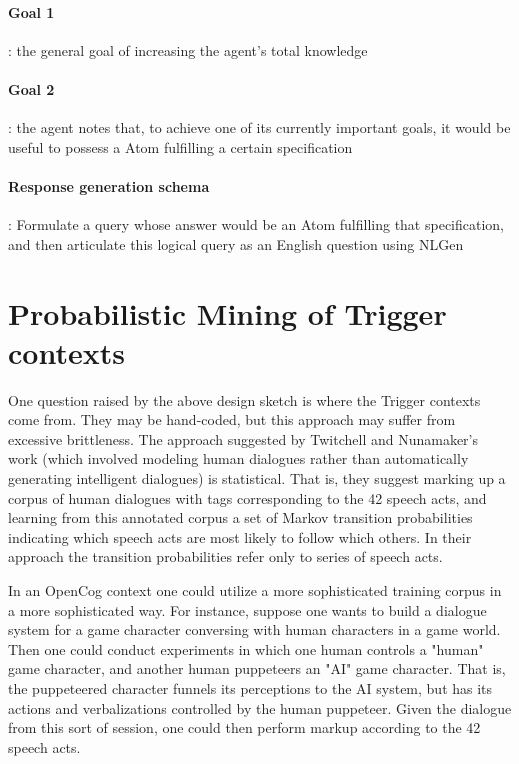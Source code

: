 \documentclass[10pt]{article}
\begin{document}
\paragraph{Goal 1}: the general goal of increasing the agent's total knowledge 

\paragraph{Goal 2}: the agent notes that, to achieve one of its currently important goals, it would be useful to possess a Atom fulfilling a certain specification

\paragraph{Response generation schema}: Formulate a query whose answer would be an Atom fulfilling that specification, and then articulate this logical query as an English question using NLGen

\section{Probabilistic Mining of Trigger contexts}

One question raised by the above design sketch is where the Trigger contexts come from.  They may be hand-coded, but this approach may suffer from excessive brittleness.  The approach suggested by Twitchell and Nunamaker's work (which involved modeling human dialogues rather than automatically generating intelligent dialogues) is statistical.  That is, they suggest marking up a corpus of human dialogues with tags corresponding to the 42 speech acts, and learning from this annotated corpus a set of Markov transition probabilities indicating which speech acts are most likely to follow which others.
In their approach the transition probabilities refer only to series of speech acts.  

In an OpenCog context one could utilize a more sophisticated training corpus in a more sophisticated way.  For instance, suppose one wants to build a dialogue system for a game character conversing with human characters in a game world.  Then one could conduct experiments in which one human controls a "human" game character, and another human puppeteers an "AI" game character.  That is, the puppeteered character funnels its perceptions to the AI system, but has its actions and verbalizations controlled by the human puppeteer.  Given the dialogue from this sort of session, one could then perform markup according to the 42 speech acts.
\end{document}
